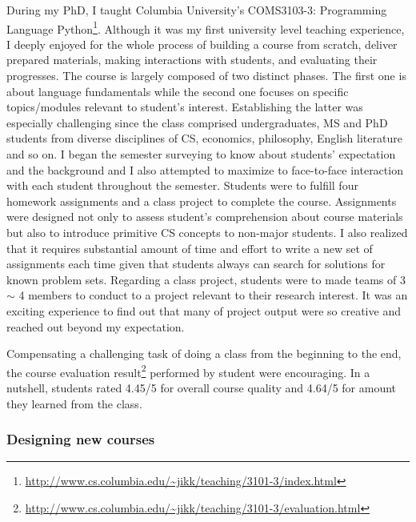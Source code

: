 \documentclass[letterpaper, 10pt]{article}
\begin{document}
\begin{small}
During my PhD, I taught Columbia University's COMS3103-3: Programming Language
Python\footnote{\url{http://www.cs.columbia.edu/~jikk/teaching/3101-3/index.html}}.
%
%
Although it was my first university level teaching experience, I deeply enjoyed 
for the whole process of building a course from scratch, deliver prepared
materials, making interactions with students, and evaluating their progresses.
% 
The course is largely composed of two distinct phases. The first one is about
language fundamentals while the second one focuses on specific topics/modules
relevant to student's interest. Establishing the latter was especially
challenging since the class comprised undergraduates, MS and PhD students from
diverse disciplines of CS, economics, philosophy, English literature and so on.
%
I began the semester surveying to know about students' expectation and the
background and I also attempted to maximize to face-to-face interaction with
each student throughout the semester.
% 
Students were to fulfill four homework assignments and a class project to
complete the course. 
%
Assignments were designed not only to assess student's comprehension about
course materials but also to introduce primitive CS concepts to non-major
students.
%
%
I also realized that it requires  substantial amount of time and effort to
write a new set of assignments each time given that students always can search
for solutions for known problem sets. 
%
Regarding a class project, students were to made teams of 3 $\sim$ 4 members to
conduct to a project relevant to their research interest.
%
It was an exciting experience to find out that many of project output were so
creative and reached out beyond my expectation.
%
%

Compensating a challenging task of doing a class from the beginning to the end,
the course evaluation
result\footnote{\url{http://www.cs.columbia.edu/~jikk/teaching/3101-3/evaluation.html}}
performed by student were encouraging. In a nutshell, students rated 4.45/5 for
overall course quality and 4.64/5 for amount they learned from the class.

\subsubsection*{Designing new courses} 


\end{small}
\end{document}
